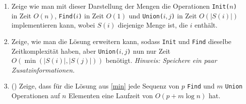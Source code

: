 \documentclass{uebung_cs}
\begin{document}
\begin{aufgabe}
\begin{center}
	\end{center}
	\begin{enumerate}
		\item Zeige wie man mit dieser Darstellung der Mengen die Operationen \texttt{Init($n$)} in Zeit $O(n)$, \texttt{Find($i$)} in Zeit $O(1)$ und \texttt{Union($i,j$)} in Zeit $O(|S(i)|)$ implementieren kann, wobei $S(i)$ diejenige Menge ist, die $i$ enthält.
		\item\label{min} Zeige, wie man die Lösung erweitern kann, sodass \texttt{Init} und \texttt{Find} dieselbe Zeitkomplexität haben, aber \texttt{Union($i,j$)} nun nur Zeit $O(\min(|S(i)|, |S(j)|))$ benötigt.
		\textit{Hinweis: Speichere ein paar Zusatzinformationen.}
		\item (\hard) Zeige, dass für die Lösung aus \ref{min} jede Sequenz von $p$ \texttt{Find} und $m$ \texttt{Union} Operationen auf $n$ Elementen eine Laufzeit von $O(p + m\log n)$ hat.
	\end{enumerate}
\end{aufgabe}
\end{document}
